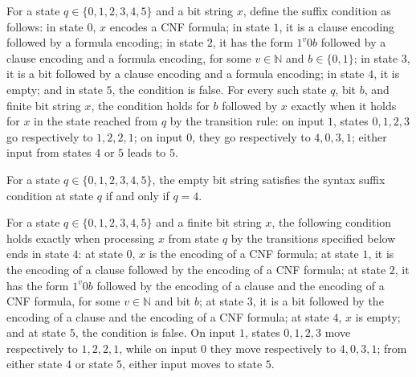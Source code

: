 \begin{theorem}
\label{Std.Sat.CNF.syntaxSuffix_cons}
\leanok
{}
For a state $q\in\{0,1,2,3,4,5\}$ and a bit string $x$, define the suffix condition as
follows: in state $0$, $x$ encodes a CNF formula; in state $1$, it is a clause encoding
followed by a formula encoding; in state $2$, it has the form $1^v0b$ followed by a
clause encoding and a formula encoding, for some $v\in\mathbb N$ and $b\in\{0,1\}$; in
state $3$, it is a bit followed by a clause encoding and a formula encoding; in state
$4$, it is empty; and in state $5$, the condition is false. For every such state $q$,
bit $b$, and finite bit string $x$, the condition holds for $b$ followed by $x$ exactly
when it holds for $x$ in the state reached from $q$ by the transition rule: on input
$1$, states $0,1,2,3$ go respectively to $1,2,2,1$; on input $0$, they go respectively
to $4,0,3,1$; either input from states $4$ or $5$ leads to $5$.
\end{theorem}

\begin{theorem}
\label{Std.Sat.CNF.syntaxSuffix_nil}
\leanok
{}
For a state $q\in\{0,1,2,3,4,5\}$, the empty bit string satisfies the syntax suffix
condition at state $q$ if and only if $q=4$.
\end{theorem}

\begin{theorem}
\label{Std.Sat.CNF.syntaxSuffix_run}
\leanok
{}
For a state $q\in\{0,1,2,3,4,5\}$ and a finite bit string $x$, the following condition
holds exactly when processing $x$ from state $q$ by the transitions specified below ends
in state $4$: at state $0$, $x$ is the encoding of a CNF formula; at state $1$, it is
the encoding of a clause followed by the encoding of a CNF formula; at state $2$, it has
the form $1^v0b$ followed by the encoding of a clause and the encoding of a CNF formula,
for some $v\in\mathbb N$ and bit $b$; at state $3$, it is a bit followed by the encoding
of a clause and the encoding of a CNF formula; at state $4$, $x$ is empty; and at state
$5$, the condition is false. On input $1$, states $0,1,2,3$ move respectively to
$1,2,2,1$, while on input $0$ they move respectively to $4,0,3,1$; from either state $4$
or state $5$, either input moves to state $5$.
\end{theorem}


